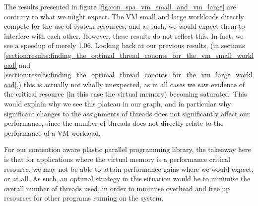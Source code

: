 The results presented in figure \ref{fig:con_spa_vm_small_and_vm_large} are contrary to what we might expect. The VM small and large workloads directly compete for the use of system resources, and as such, we would expect them to interfere with each other. However, these results do not reflect this. In fact, we see a speedup of merely 1.06. Looking back at our previous results, (in sections \ref{section:results:finding_the_optimal_thread_couonts_for_the_vm_small_workload} and \ref{section:results:finding_the_optimal_thread_couonts_for_the_vm_large_workload},) this is actually not wholly unexpected, as in all cases we saw evidence of the critical resource (in this case the virtual memory) becoming saturated. This would explain why we see this plateau in our graph, and in particular why significant changes to the assignments of threads does not significantly affect our performance, since the number of threads does not directly relate to the performance of a VM workload.

For our contention aware plastic parallel programming library, the takeaway here is that for applications where the virtual memory is a performance critical resource, we may not be able to attain performance gains where we would expect, or at all. As such, an optimal strategy in this situation would be to minimise the overall number of threads used, in order to minimise overhead and free up resources for other programs running on the system.



